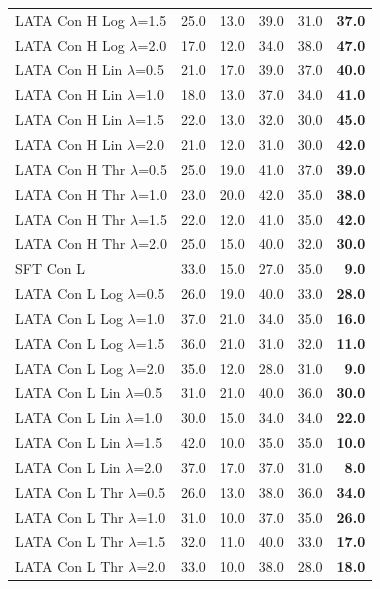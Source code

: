 \begin{longtable}{lrrrrr}
LATA Con H Log $\lambda$=1.5 & 25.0 & 13.0 & 39.0 & 31.0 & \textbf{37.0} \\
LATA Con H Log $\lambda$=2.0 & 17.0 & 12.0 & 34.0 & 38.0 & \textbf{47.0} \\
LATA Con H Lin $\lambda$=0.5 & 21.0 & 17.0 & 39.0 & 37.0 & \textbf{40.0} \\
LATA Con H Lin $\lambda$=1.0 & 18.0 & 13.0 & 37.0 & 34.0 & \textbf{41.0} \\
LATA Con H Lin $\lambda$=1.5 & 22.0 & 13.0 & 32.0 & 30.0 & \textbf{45.0} \\
LATA Con H Lin $\lambda$=2.0 & 21.0 & 12.0 & 31.0 & 30.0 & \textbf{42.0} \\
LATA Con H Thr $\lambda$=0.5 & 25.0 & 19.0 & 41.0 & 37.0 & \textbf{39.0} \\
LATA Con H Thr $\lambda$=1.0 & 23.0 & 20.0 & 42.0 & 35.0 & \textbf{38.0} \\
LATA Con H Thr $\lambda$=1.5 & 22.0 & 12.0 & 41.0 & 35.0 & \textbf{42.0} \\
LATA Con H Thr $\lambda$=2.0 & 25.0 & 15.0 & 40.0 & 32.0 & \textbf{30.0} \\
SFT Con L & 33.0 & 15.0 & 27.0 & 35.0 & \textbf{9.0} \\
LATA Con L Log $\lambda$=0.5 & 26.0 & 19.0 & 40.0 & 33.0 & \textbf{28.0} \\
LATA Con L Log $\lambda$=1.0 & 37.0 & 21.0 & 34.0 & 35.0 & \textbf{16.0} \\
LATA Con L Log $\lambda$=1.5 & 36.0 & 21.0 & 31.0 & 32.0 & \textbf{11.0} \\
LATA Con L Log $\lambda$=2.0 & 35.0 & 12.0 & 28.0 & 31.0 & \textbf{9.0} \\
LATA Con L Lin $\lambda$=0.5 & 31.0 & 21.0 & 40.0 & 36.0 & \textbf{30.0} \\
LATA Con L Lin $\lambda$=1.0 & 30.0 & 15.0 & 34.0 & 34.0 & \textbf{22.0} \\
LATA Con L Lin $\lambda$=1.5 & 42.0 & 10.0 & 35.0 & 35.0 & \textbf{10.0} \\
LATA Con L Lin $\lambda$=2.0 & 37.0 & 17.0 & 37.0 & 31.0 & \textbf{8.0} \\
LATA Con L Thr $\lambda$=0.5 & 26.0 & 13.0 & 38.0 & 36.0 & \textbf{34.0} \\
LATA Con L Thr $\lambda$=1.0 & 31.0 & 10.0 & 37.0 & 35.0 & \textbf{26.0} \\
LATA Con L Thr $\lambda$=1.5 & 32.0 & 11.0 & 40.0 & 33.0 & \textbf{17.0} \\
LATA Con L Thr $\lambda$=2.0 & 33.0 & 10.0 & 38.0 & 28.0 & \textbf{18.0} \\
\end{longtable}
